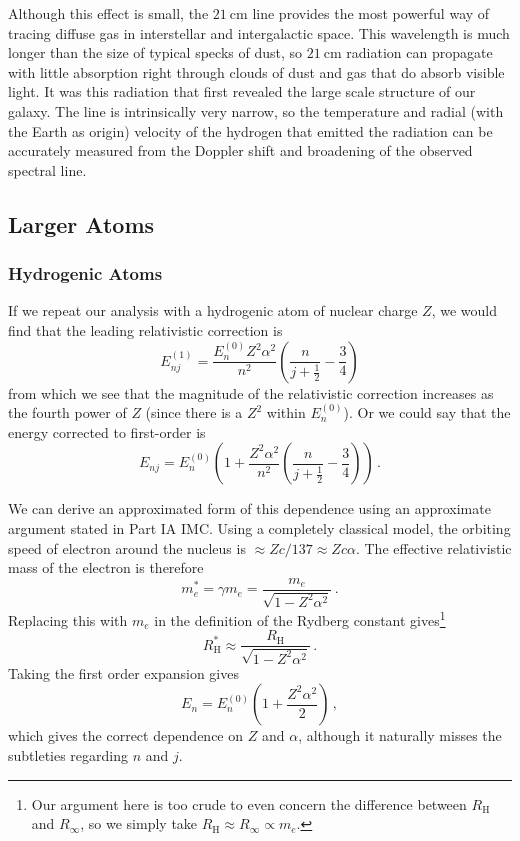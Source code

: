 \documentclass{article}
\theoremstyle{plain}\theoremheaderfont{\normalfont\itshape}\theorembodyfont{\rmfamily}\theoremseparator{.}\newtheorem*{rem}{Remark}\newtheorem*{ex}{Example}\newtheorem*{proof}{Proof}\newtheorem*{altp}{Alternative proof}
\theoremstyle{plain}\theoremheaderfont{\normalfont\bfseries}\theorembodyfont{\rmfamily}\theoremseparator{.}\newtheorem{thm}{Theorem}[section]\newtheorem{lem}[thm]{Lemma}\newtheorem{prop}[thm]{Proposition}\newtheorem*{cor}{Corollary}\newtheorem{defn}[thm]{Definition}\newtheorem{clm}[thm]{Claim}\newtheorem{clminproof}{Claim}
\theoremstyle{break}\theoremheaderfont{\normalfont\itshape}\theorembodyfont{\rmfamily}\theoremseparator{.\medskip}\newtheorem*{proofskip}{Proof}\newtheorem*{exs}{Examples}\newtheorem*{rems}{Remarks}
\theoremstyle{break}\theoremheaderfont{\normalfont\bfseries}\theorembodyfont{\rmfamily}\theoremseparator{.\medskip}\newtheorem{lemskip}[thm]{Lemma}\newtheorem{defnskip}[thm]{Definition}\newtheorem{propskip}[thm]{Proposition}\newtheorem{thmskip}[thm]{Theorem}
\numberwithin{equation}{section}
\newcommand{\unit}[1]{\ \mathrm{#1}}
\begin{document}
    Although this effect is small, the \(21\unit{cm}\) line provides the most powerful way of tracing diffuse gas in interstellar and intergalactic space. This wavelength is much longer than the size of typical specks of dust, so \(21\unit{cm}\) radiation can propagate with little absorption right through clouds of dust and gas that do absorb visible light. It was this radiation that first revealed the large scale structure of our galaxy. The line is intrinsically very narrow, so the temperature and radial (with the Earth as origin) velocity of the hydrogen that emitted the radiation can be accurately measured from the Doppler shift and broadening of the observed spectral line.

    \subsection{Larger Atoms}
    \subsubsection{Hydrogenic Atoms}
    If we repeat our analysis with a hydrogenic atom of nuclear charge \(Z\), we would find that the leading relativistic correction is
    \begin{equation}
        E_{nj}^{(1)}=\frac{E_n^{(0)}Z^2\alpha^2}{n^2}\left(\frac{n}{j+\frac{1}{2}}-\frac{3}{4}\right)
    \end{equation}
    from which we see that the magnitude of the relativistic correction increases as the fourth power of \(Z\) (since there is a \(Z^2\) within \(E_n^{(0)}\)). Or we could say that the energy corrected to first-order is
    \begin{equation}
        E_{nj}=E_n^{(0)}\left(1+\frac{Z^2\alpha^2}{n^2}\left(\frac{n}{j+\frac{1}{2}}-\frac{3}{4}\right)\right)\,.
    \end{equation}

    We can derive an approximated form of this dependence using an approximate argument stated in Part IA IMC. Using a completely classical model, the orbiting speed of electron around the nucleus is \(\approx Zc/137\approx Zc\alpha\). The effective relativistic mass of the electron is therefore
    \begin{equation}
        m_e^*=\gamma m_e =\frac{m_e}{\sqrt{1-Z^2\alpha^2}}\,.
    \end{equation}
    Replacing this with \(m_e\) in the definition of the Rydberg constant gives\footnote{Our argument here is too crude to even concern the difference between \(R_{\mathrm{H}}\) and \(R_\infty\), so we simply take \(R_{\mathrm{H}}\approx R_\infty\propto m_e\).}
    \begin{equation}
        R_{\mathrm{H}}^*\approx\frac{R_\mathrm{H}}{\sqrt{1-Z^2\alpha^2}}\,.
    \end{equation}
    Taking the first order expansion gives
    \begin{equation}
        E_n=E_n^{(0)}\left(1+\frac{Z^2\alpha^2}{2}\right)\,,
    \end{equation}
    which gives the correct dependence on \(Z\) and \(\alpha\), although it naturally misses the subtleties regarding \(n\) and \(j\).
\end{document}
